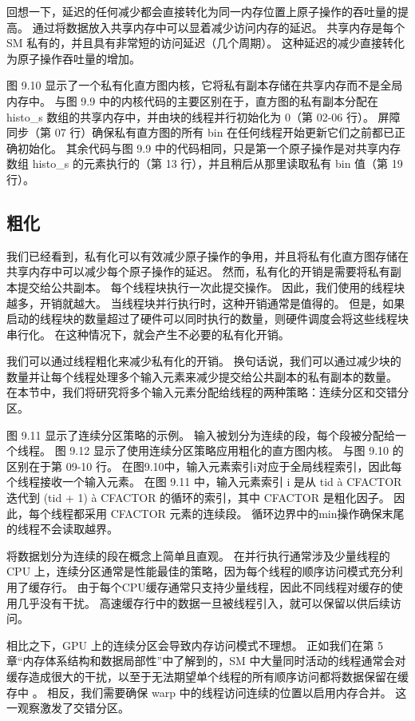 回想一下，延迟的任何减少都会直接转化为同一内存位置上原子操作的吞吐量的提高。 通过将数据放入共享内存中可以显着减少访问内存的延迟。 共享内存是每个 SM 私有的，并且具有非常短的访问延迟（几个周期）。 这种延迟的减少直接转化为原子操作吞吐量的增加。

图 9.10 显示了一个私有化直方图内核，它将私有副本存储在共享内存而不是全局内存中。 与图 9.9 中的内核代码的主要区别在于，直方图的私有副本分配在 histo\_s 数组的共享内存中，并由块的线程并行初始化为 0（第 02-06 行）。 屏障同步（第 07 行）确保私有直方图的所有 bin 在任何线程开始更新它们之前都已正确初始化。 其余代码与图 9.9 中的代码相同，只是第一个原子操作是对共享内存数组 histo\_s 的元素执行的（第 13 行），并且稍后从那里读取私有 bin 值（第 19 行）。

\subsection{粗化}
我们已经看到，私有化可以有效减少原子操作的争用，并且将私有化直方图存储在共享内存中可以减少每个原子操作的延迟。 然而，私有化的开销是需要将私有副本提交给公共副本。 每个线程块执行一次此提交操作。 因此，我们使用的线程块越多，开销就越大。 当线程块并行执行时，这种开销通常是值得的。 但是，如果启动的线程块的数量超过了硬件可以同时执行的数量，则硬件调度会将这些线程块串行化。 在这种情况下，就会产生不必要的私有化开销。

我们可以通过线程粗化来减少私有化的开销。 换句话说，我们可以通过减少块的数量并让每个线程处理多个输入元素来减少提交给公共副本的私有副本的数量。 在本节中，我们将研究将多个输入元素分配给线程的两种策略：连续分区和交错分区。

图 9.11 显示了连续分区策略的示例。 输入被划分为连续的段，每个段被分配给一个线程。 图 9.12 显示了使用连续分区策略应用粗化的直方图内核。 与图 9.10 的区别在于第 09-10 行。 在图9.10中，输入元素索引i对应于全局线程索引，因此每个线程接收一个输入元素。 在图 9.11 中，输入元素索引 i 是从 tid à CFACTOR 迭代到 (tid + 1) à CFACTOR 的循环的索引，其中 CFACTOR 是粗化因子。 因此，每个线程都采用 CFACTOR 元素的连续段。 循环边界中的min操作确保末尾的线程不会读取越界。

将数据划分为连续的段在概念上简单且直观。 在并行执行通常涉及少量线程的 CPU 上，连续分区通常是性能最佳的策略，因为每个线程的顺序访问模式充分利用了缓存行。 由于每个CPU缓存通常只支持少量线程，因此不同线程对缓存的使用几乎没有干扰。 高速缓存行中的数据一旦被线程引入，就可以保留以供后续访问。

相比之下，GPU 上的连续分区会导致内存访问模式不理想。 正如我们在第 5 章“内存体系结构和数据局部性”中了解到的，SM 中大量同时活动的线程通常会对缓存造成很大的干扰，以至于无法期望单个线程的所有顺序访问都将数据保留在缓存中 。 相反，我们需要确保 warp 中的线程访问连续的位置以启用内存合并。 这一观察激发了交错分区。

